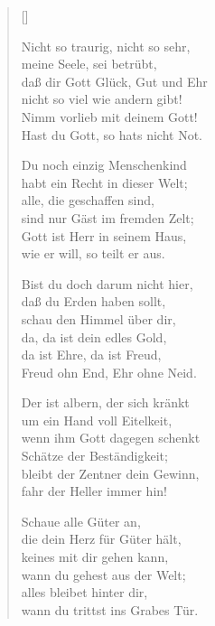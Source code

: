 \begin{multicols}{2}
\settowidth{\versewidth}{Nicht so traurig, nicht so sehr,}
\begin{verse}[\versewidth]

 Nicht so traurig, nicht so sehr,\\
meine Seele, sei betrübt,\\
daß dir Gott Glück, Gut und Ehr\\
nicht so viel wie andern gibt!\\
Nimm vorlieb mit deinem Gott!\\
Hast du Gott, so hats nicht Not.

 Du noch einzig Menschenkind\\
habt ein Recht in dieser Welt;\\
alle, die geschaffen sind,\\
sind nur Gäst im fremden Zelt;\\
Gott ist Herr in seinem Haus,\\
wie er will, so teilt er aus.

 Bist du doch darum nicht hier,\\
daß du Erden haben sollt,\\
schau den Himmel über dir,\\
da, da ist dein edles Gold,\\
da ist Ehre, da ist Freud,\\
Freud ohn End, Ehr ohne Neid.

 Der ist albern, der sich kränkt\\
um ein Hand voll Eitelkeit,\\
wenn ihm Gott dagegen schenkt\\
Schätze der Beständigkeit;\\
bleibt der Zentner dein Gewinn,\\
fahr der Heller immer hin!

 Schaue alle Güter an,\\
die dein Herz für Güter hält,\\
keines mit dir gehen kann,\\
wann du gehest aus der Welt;\\
alles bleibet hinter dir,\\
wann du trittst ins Grabes Tür.


\end{verse}
\end{multicols}
